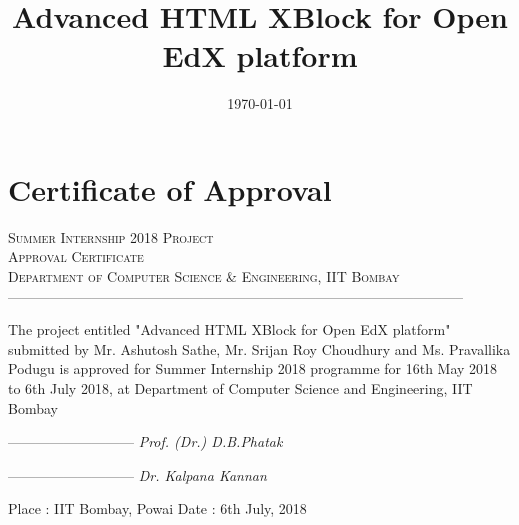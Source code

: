 \documentclass[a4paper, twosided, openany]{memoir}
\begin{document}
\pagestyle{plain}
\title{Advanced HTML XBlock for Open EdX platform}
\date{\today}

\frontmatter


\chapter*{Certificate of Approval}

\begin{center}
\textsc{\LARGE Summer Internship 2018 Project}\\
\bigskip
\textsc{\Large Approval Certificate}\\
\bigskip
\textsc{ Department of Computer Science \& Engineering, IIT Bombay}\\
\textsc{--------------------------------------------------------------------------------------------------}\\
\bigskip\bigskip\bigskip\bigskip\bigskip\bigskip

The project entitled "Advanced HTML XBlock for Open EdX platform" submitted by Mr. Ashutosh Sathe, Mr. Srijan Roy Choudhury and Ms. Pravallika Podugu is approved for Summer Internship 2018 programme for 16th May 2018 to 6th July 2018, at Department of Computer Science and Engineering, IIT Bombay
\end{center}
\vspace*{\fill}
\begin{center}
	\begin{flushleft}
		\bigskip
		\textsc{---------------------------}\newline
		\bigskip
		\emph{Prof. (Dr.) D.B.Phatak}

		\bigskip
		\bigskip
		\bigskip
		\bigskip
		\textsc{---------------------------}\newline
		\bigskip
		\emph{Dr. Kalpana Kannan}

		\bigskip
		\bigskip
		Place : IIT Bombay, Powai\newline
		Date : 6th July, 2018
		\bigskip
		\bigskip
		\bigskip
	\end{flushleft}
\end{center}
\end{document}
